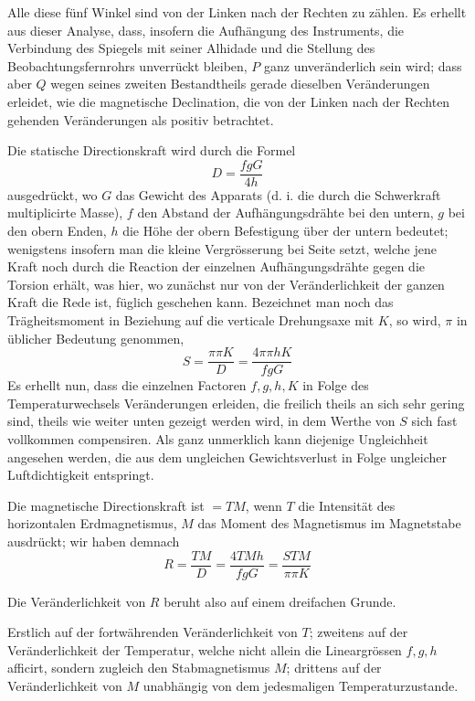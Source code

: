 Alle diese fünf Winkel sind von der Linken nach der Rechten zu zählen. Es erhellt aus dieser Analyse, dass, insofern die Aufhängung des Instruments, die Verbindung des Spiegels mit seiner Alhidade und die Stellung des Beobachtungsfernrohrs unverrückt bleiben, $P$ ganz unveränderlich sein wird; dass aber $Q$ wegen seines zweiten Bestandtheils gerade dieselben Veränderungen erleidet, wie die magnetische Declination, die von der Linken nach der Rechten gehenden Veränderungen als positiv betrachtet.

Die statische Directionskraft wird durch die Formel
\[
D=\frac{fgG}{4h}
\]
ausgedrückt, wo $G$ das Gewicht des Apparats (d. i. die durch die Schwerkraft multiplicirte Masse), $f$ den Abstand der Aufhängungsdrähte bei den untern, $g$ bei den obern Enden, $h$ die Höhe der obern Befestigung über der untern bedeutet; wenigstens insofern man die kleine Vergrösserung bei Seite setzt, welche jene Kraft noch durch die Reaction der einzelnen Aufhängungsdrähte gegen die Torsion erhält, was hier, wo zunächst nur von der Veränderlichkeit der ganzen Kraft die Rede ist, füglich geschehen kann. Bezeichnet man noch das Trägheitsmoment in Beziehung auf die verticale Drehungsaxe mit $K$, so wird, $\pi$ in üblicher Bedeutung genommen,
\[
S=\frac{\pi\pi K}{D}=\frac{4\pi\pi hK}{fgG}
\]
Es erhellt nun, dass die einzelnen Factoren $f,g,h,K$ in Folge des Temperaturwechsels Veränderungen erleiden, die freilich theils an sich sehr gering sind, theils wie weiter unten gezeigt werden wird, in dem Werthe von $S$ sich fast vollkommen compensiren. Als ganz unmerklich kann diejenige Ungleichheit angesehen werden, die aus dem ungleichen Gewichtsverlust in Folge ungleicher Luftdichtigkeit entspringt.

Die magnetische Directionskraft ist $=TM$, wenn $T$ die Intensität des horizontalen Erdmagnetismus, $M$ das Moment des Magnetismus im Magnetstabe ausdrückt; wir haben demnach
\[
R=\frac{TM}{D}=\frac{4TMh}{fgG}=\frac{STM}{\pi\pi K}
\]

Die Veränderlichkeit von $R$ beruht also auf einem dreifachen Grunde.

Erstlich auf der fortwährenden Veränderlichkeit von $T$; zweitens auf der Veränderlichkeit der Temperatur, welche nicht allein die Lineargrössen $f,g,h$ afficirt, sondern zugleich den Stabmagnetismus $M$; drittens auf der Veränderlichkeit von $M$ unabhängig von dem jedesmaligen Temperaturzustande.

